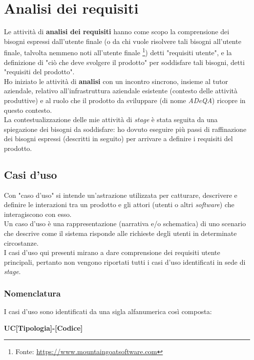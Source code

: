 \section{Analisi dei requisiti}
Le attività di \textbf{analisi dei requisiti} hanno come scopo la comprensione dei bisogni espressi dall'utente finale (o da chi vuole risolvere tali bisogni all'utente finale, talvolta nemmeno noti all'utente finale \footnote{Fonte: \href{https://www.mountaingoatsoftware.com/articles/i-didnt-know-i-needed-that}{https://www.mountaingoatsoftware.com}})
detti "requisiti utente", e la definizione di "ciò che deve svolgere il prodotto" per soddisfare tali bisogni, detti "requisiti del prodotto". \\
Ho iniziato le attività di \textbf{analisi} con un incontro sincrono, insieme al tutor aziendale, relativo all'infrastruttura aziendale esistente (contesto delle attività produttive) e al ruolo che il prodotto da sviluppare (di nome \textit{ADeQA}) ricopre in questo contesto. \\
La contestualizzazione delle mie attività di \textit{stage} è stata seguita da una spiegazione dei bisogni da soddisfare: ho dovuto eseguire più passi di raffinazione dei bisogni espressi (descritti in seguito) per arrivare a definire i requisiti del prodotto.

\subsection{Casi d'uso}
Con "caso d'uso" si intende un'astrazione utilizzata per catturare, descrivere e definire le interazioni tra un prodotto e gli attori (utenti o altri \textit{software}) che interagiscono con esso. \\
Un caso d'uso è una rappresentazione (narrativa e/o schematica) di uno scenario che descrive come il sistema risponde alle richieste degli utenti in determinate circostanze. \\
I casi d’uso qui presenti mirano a dare comprensione dei requisiti utente principali, pertanto non vengono riportati tutti i casi d'uso identificati in sede di \textit{stage}.
\subsubsection*{Nomenclatura}

I casi d'uso sono identificati da una sigla alfanumerica così composta:
\begin{center}
    \textbf{UC[Tipologia]-[Codice]}
\end{center}

